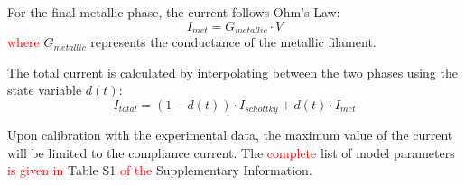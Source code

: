 \documentclass[aip,apl,reprint,floatfix]{revtex4-2}
\newcommand{\changed}[1]{\textcolor{red}{#1}}
\begin{document}
For the final metallic phase, the current follows Ohm's Law:
\begin{equation}
    I_{met} = G_{metallic} \cdot V
\end{equation}
\changed{where} $G_{metallic}$ represents the conductance of the metallic filament.

The total current is calculated by interpolating between the two phases using the state variable $d(t)$:
\begin{equation}
    I_{total} = (1 - d(t)) \cdot I_{schottky} + d(t) \cdot I_{met}
\end{equation}

Upon calibration with the experimental data, the maximum value of the current will be limited to the compliance current. The \changed{complete} list of model parameters \changed{is given in} Table S1 \changed{of the} Supplementary Information.




\end{document}
